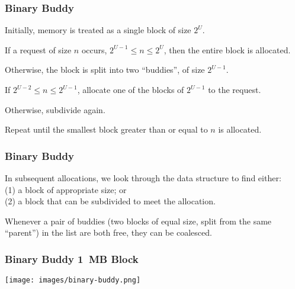 \begin{frame}
\frametitle{Binary Buddy}

Initially, memory is treated as a single block of size $2^{U}$. 

If a request of size $n$ occurs, $2^{U-1} \leq n \leq 2^{U}$, then the entire block is allocated. 

Otherwise, the block is split into two ``buddies'', of size $2^{U-1}$. 

If $2^{U-2} \leq n \leq 2^{U-1}$, allocate one of the blocks of $2^{U-1}$ to the request.

Otherwise, subdivide again. 
 
Repeat until the smallest block greater than or equal to $n$ is allocated. 

\end{frame}

\begin{frame}
\frametitle{Binary Buddy}

In subsequent allocations, we look through the data structure to find either:\\
\quad (1) a block of appropriate size; or\\
\quad (2) a block that can be subdivided to meet the allocation. 

Whenever a pair of buddies (two blocks of equal size, split from the same ``parent'') in the list are both free, they can be coalesced.

\end{frame}


\begin{frame}
\frametitle{Binary Buddy 1~MB Block}

\begin{center}
\texttt{[image: images/binary-buddy.png]}
\end{center}


\end{frame}



